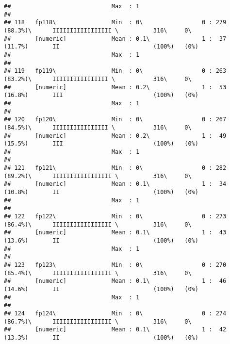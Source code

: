 \documentclass[]{article}
\begin{document}
\begin{verbatim}
##                             Max  : 1                                                                                       
## 
## 118   fp118\                Min  : 0\                 0 : 279 (88.3%)\      IIIIIIIIIIIIIIIII \          316\     0\       
##       [numeric]             Mean : 0.1\               1 :  37 (11.7%)       II                           (100%)   (0%)     
##                             Max  : 1                                                                                       
## 
## 119   fp119\                Min  : 0\                 0 : 263 (83.2%)\      IIIIIIIIIIIIIIII \           316\     0\       
##       [numeric]             Mean : 0.2\               1 :  53 (16.8%)       III                          (100%)   (0%)     
##                             Max  : 1                                                                                       
## 
## 120   fp120\                Min  : 0\                 0 : 267 (84.5%)\      IIIIIIIIIIIIIIII \           316\     0\       
##       [numeric]             Mean : 0.2\               1 :  49 (15.5%)       III                          (100%)   (0%)     
##                             Max  : 1                                                                                       
## 
## 121   fp121\                Min  : 0\                 0 : 282 (89.2%)\      IIIIIIIIIIIIIIIII \          316\     0\       
##       [numeric]             Mean : 0.1\               1 :  34 (10.8%)       II                           (100%)   (0%)     
##                             Max  : 1                                                                                       
## 
## 122   fp122\                Min  : 0\                 0 : 273 (86.4%)\      IIIIIIIIIIIIIIIII \          316\     0\       
##       [numeric]             Mean : 0.1\               1 :  43 (13.6%)       II                           (100%)   (0%)     
##                             Max  : 1                                                                                       
## 
## 123   fp123\                Min  : 0\                 0 : 270 (85.4%)\      IIIIIIIIIIIIIIIII \          316\     0\       
##       [numeric]             Mean : 0.1\               1 :  46 (14.6%)       II                           (100%)   (0%)     
##                             Max  : 1                                                                                       
## 
## 124   fp124\                Min  : 0\                 0 : 274 (86.7%)\      IIIIIIIIIIIIIIIII \          316\     0\       
##       [numeric]             Mean : 0.1\               1 :  42 (13.3%)       II                           (100%)   (0%)     

\end{verbatim}
\end{document}
